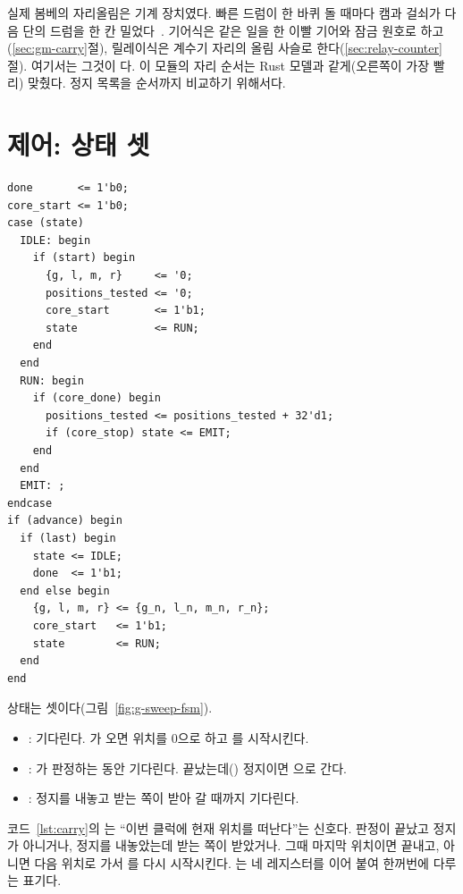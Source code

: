 \Ours 실제 봄베의 자리올림은 기계 장치였다. 빠른 드럼이 한 바퀴 돌 때마다 캠과 걸쇠가 다음 단의 드럼을
한 칸 밀었다~\cite[70--73]{us6812report1944}. 기어식은 같은 일을 한 이빨 기어와 잠금 원호로
하고(\ref{sec:gm-carry}절), 릴레이식은 계수기 자리의 올림 사슬로 한다(\ref{sec:relay-counter}절). 여기서는
그것이 다. 이 모듈의 자리 순서는
Rust 모델과 같게(오른쪽이 가장 빨리) 맞췄다. 정지 목록을 순서까지 비교하기 위해서다.

\section{제어: 상태 셋}

\begin{lstlisting}[language=SV,caption={\code{bombe\_sweep.sv}: 제어(리셋 부분 생략).},label={lst:sweep-fsm}]
done       <= 1'b0;
core_start <= 1'b0;
case (state)
  IDLE: begin
    if (start) begin
      {g, l, m, r}     <= '0;
      positions_tested <= '0;
      core_start       <= 1'b1;
      state            <= RUN;
    end
  end
  RUN: begin
    if (core_done) begin
      positions_tested <= positions_tested + 32'd1;
      if (core_stop) state <= EMIT;
    end
  end
  EMIT: ;
endcase
if (advance) begin
  if (last) begin
    state <= IDLE;
    done  <= 1'b1;
  end else begin
    {g, l, m, r} <= {g_n, l_n, m_n, r_n};
    core_start   <= 1'b1;
    state        <= RUN;
  end
end
\end{lstlisting}

상태는 셋이다(그림~\ref{fig:g-sweep-fsm}).

\begin{itemize}
\item {}: 기다린다. 가 오면 위치를 0으로 하고 를 시작시킨다.
\item {}: 가 판정하는 동안 기다린다. 끝났는데() 정지이면
으로 간다.
\item {}: 정지를 내놓고 받는 쪽이 받아 갈 때까지 기다린다.
\end{itemize}

코드~\ref{lst:carry}의 는 ``이번 클럭에 현재 위치를 떠난다''는 신호다. 판정이 끝났고 정지가
아니거나, 정지를 내놓았는데 받는 쪽이 받았거나. 그때 마지막 위치이면 끝내고, 아니면 다음 위치로 가서
를 다시 시작시킨다. 는 네 레지스터를 이어 붙여 한꺼번에 다루는 표기다.

